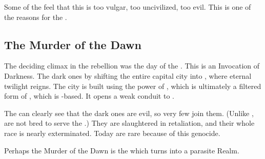 Some of the \CiriathSepher{} feel that this is too vulgar, too uncivilized, too evil. 
This is one of the reasons for the . 









\subsection{The Murder of the Dawn}
The deciding climax in the rebellion was the day of the . 
This is an Invocation of \Erebean{} Darkness. 
The dark ones  by shifting the entire capital city into \Nyx, where eternal twilight reigns. 
The city is built using the power of , which is ultimately a filtered form of \nieur, which is \Nyx-based.
It opens a weak conduit to \Erebos. 

The \nephilim{} can clearly see that the dark ones are evil, so very few \nephilim{} join them. 
(Unlike \humans, \nephilim{} are not bred to serve the \resphain.) 
They are slaughtered in retaliation, and their whole race is nearly exterminated. 
Today \nephilim{} are rare because of this genocide. 

Perhaps the Murder of the Dawn is the  which turns \Nyx{} into a parasite Realm. 

